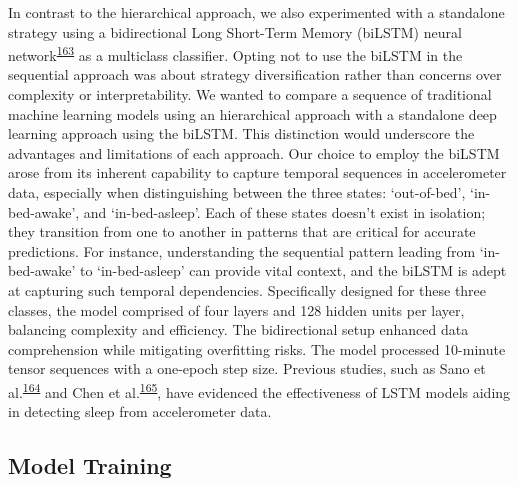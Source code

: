 \documentclass[
  10pt,
]{scrbook}
\begin{document}
In contrast to the hierarchical approach, we also experimented with a
standalone strategy using a bidirectional Long Short-Term Memory
(biLSTM) neural
network\textsuperscript{\protect\hyperlink{ref-hochreiter_long_1997}{163}}
as a multiclass classifier. Opting not to use the biLSTM in the
sequential approach was about strategy diversification rather than
concerns over complexity or interpretability. We wanted to compare a
sequence of traditional machine learning models using an hierarchical
approach with a standalone deep learning approach using the biLSTM. This
distinction would underscore the advantages and limitations of each
approach. Our choice to employ the biLSTM arose from its inherent
capability to capture temporal sequences in accelerometer data,
especially when distinguishing between the three states: `out-of-bed',
`in-bed-awake', and `in-bed-asleep'. Each of these states doesn't exist
in isolation; they transition from one to another in patterns that are
critical for accurate predictions. For instance, understanding the
sequential pattern leading from `in-bed-awake' to `in-bed-asleep' can
provide vital context, and the biLSTM is adept at capturing such
temporal dependencies. Specifically designed for these three classes,
the model comprised of four layers and 128 hidden units per layer,
balancing complexity and efficiency. The bidirectional setup enhanced
data comprehension while mitigating overfitting risks. The model
processed 10-minute tensor sequences with a one-epoch step size.
Previous studies, such as Sano et
al.\textsuperscript{\protect\hyperlink{ref-sano_multimodal_2019}{164}}
and Chen et
al.\textsuperscript{\protect\hyperlink{ref-chen_attention_2021}{165}},
have evidenced the effectiveness of LSTM models aiding in detecting
sleep from accelerometer data.

\hypertarget{model-training}{%
\subsection{Model Training}\label{model-training}}
\end{document}
